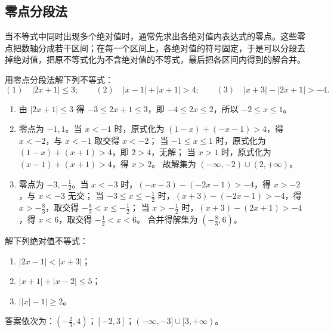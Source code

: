 \subsection{零点分段法}
当不等式中同时出现多个绝对值时，通常先求出各绝对值内表达式的零点。这些零点把数轴分成若干区间；在每一个区间上，各绝对值的符号固定，于是可以分段去掉绝对值，把原不等式化为不含绝对值的不等式，最后把各区间内得到的解合并。
\begin{example}
  用零点分段法解下列不等式：
  \[
  (1)\quad |2x+1|\le 3;\qquad
  (2)\quad |x-1|+|x+1|>4;\qquad
  (3)\quad |x+3|-|2x+1|>-4.
  \]
\end{example}
\begin{jie}
  \begin{enumerate}
    \item 由 \(|2x+1|\le 3\) 得 \(-3\le 2x+1\le 3\)，即 \(-4\le 2x\le 2\)，所以 \(-2\le x\le 1\)。
    \item 零点为 \(-1,1\)。当 \(x<-1\) 时，原式化为 \((1-x)+(-x-1)>4\)，得 \(x<-2\)，与 \(x<-1\) 取交得 \(x<-2\)；
    当 \(-1\le x\le 1\) 时，原式化为 \((1-x)+(x+1)>4\)，即 \(2>4\)，无解；
    当 \(x>1\) 时，原式化为 \((x-1)+(x+1)>4\)，得 \(x>2\)。
    故解集为 \((-\infty,-2)\cup(2,+\infty)\)。
    \item 零点为 \(-3,-\frac12\)。当 \(x<-3\) 时，\((-x-3)-(-2x-1)>-4\)，得 \(x>-2\)，与 \(x<-3\) 无交；
    当 \(-3\le x\le-\frac12\) 时，\((x+3)-(-2x-1)>-4\)，得 \(x>-\frac83\)，取交得 \(-\frac83<x\le-\frac12\)；
    当 \(x>-\frac12\) 时，\((x+3)-(2x+1)>-4\)，得 \(x<6\)，取交得 \(-\frac12<x<6\)。
    合并得解集为 \((-\frac83,6)\)。
  \end{enumerate}
\end{jie}

\begin{exercise}
  解下列绝对值不等式：
  \begin{enumerate}
    \item \(|2x-1|<|x+3|\)；
    \item \(|x+1|+|x-2|\le 5\)；
    \item \(\left||x|-1\right|\ge 2\)。
  \end{enumerate}
\end{exercise}
\begin{hint}
  答案依次为：\((-\frac23,4)\)；\([-2,3]\)；\((-\infty,-3]\cup[3,+\infty)\)。
\end{hint}

\clearpage

